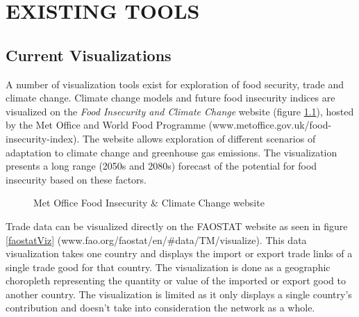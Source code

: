 \chapter{EXISTING TOOLS}
\label{existingVisualizationsChapter}
\section{Current Visualizations}
A number of visualization tools exist for exploration of food security, trade and climate change. Climate change models and future food insecurity indices are visualized on the \textit{Food Insecurity and Climate Change} website (figure \ref{metOffice}), hosted by the Met Office and World Food Programme (www.metoffice.gov.uk/food-insecurity-index). The website allows exploration of different scenarios of adaptation to climate change and greenhouse gas emissions. The visualization presents a long range (2050s and 2080s) forecast of the potential for food insecurity based on these factors.\par
\begin{figure}[htb]
	\caption{Met Office Food Insecurity \& Climate Change website}
	\label{metOffice}
\end{figure}
Trade data can be visualized directly on the FAOSTAT website as seen in figure \ref{faostatViz} (www.fao.org/faostat/en/\#data/TM/visualize). This data visualization takes one country and displays the import or export trade links of a single trade good for that country. The visualization is done as a geographic choropleth representing the quantity or value of the imported or export good to another country. The visualization is limited as it only displays a single country's contribution and doesn't take into consideration the network as a whole.\par
